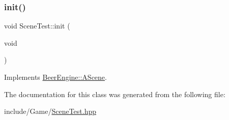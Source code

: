 \mbox{\label{class_scene_test_aedded03410798c3705fb3fb028e56ab5}} 
\subsubsection{\texorpdfstring{init()}{init()}}
{\footnotesize\ttfamily void Scene\+Test\+::init (\begin{DoxyParamCaption}\item[{void}]{ }\end{DoxyParamCaption})\hspace{0.3cm}{\ttfamily [virtual]}}



Implements \mbox{\hyperlink{class_beer_engine_1_1_a_scene_a7a55b4e506ae618e6596ae812ad48db0}{Beer\+Engine\+::\+A\+Scene}}.



The documentation for this class was generated from the following file\+:\begin{DoxyCompactItemize}
\item 
include/\+Game/\mbox{\hyperlink{_scene_test_8hpp}{Scene\+Test.\+hpp}}\end{DoxyCompactItemize}
